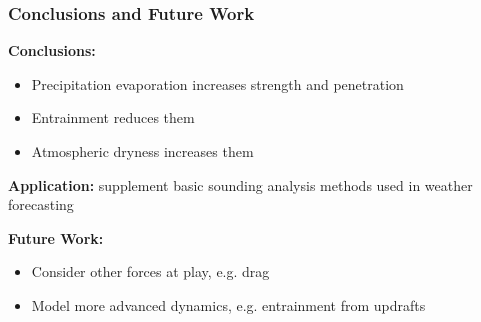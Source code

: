 \documentclass[handout]{beamer}
\begin{document}
\begin{frame}
    \frametitle{Conclusions and Future Work}
    \textbf{Conclusions:}
    \begin{itemize}
        \item Precipitation evaporation increases strength and penetration
        \item Entrainment reduces them
        \item Atmospheric dryness increases them
    \end{itemize}

    \textbf{Application:} supplement basic sounding analysis methods used
    in weather forecasting

    \textbf{Future Work:}
    \begin{itemize}
        \item Consider other forces at play, e.g. drag
        \item Model more advanced dynamics, e.g. entrainment from
            updrafts
    \end{itemize}
\end{frame}
\end{document}
